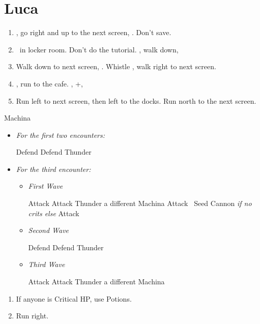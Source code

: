\chapter{Luca}

\begin{enumerate}
	\item \sd, go right and up to the next screen, \cs[2:30]. Don't save.
	\item \sd\ in locker room. Don't do the tutorial. \sd, walk down, \sd
	\item Walk down to next screen, \sd. Whistle \cs[0:30], walk right to next screen.
	\item \sd, run to the cafe. \sd, \skippablefmv+\cs[1:20], \sd
	\item Run left to next screen, then left to the docks. Run north to the next screen.
\end{enumerate}
\begin{battle}{Machina}
	\begin{itemize}
	\item \textit{For the first two encounters:}
	\begin{itemize}
		\tidusf Defend
		\kimahrif Defend
		\luluf Thunder
	\end{itemize}
	\item \textit{For the third encounter:}
	\begin{itemize}
		\item \textit{First Wave}
		\begin{itemize}
			\tidusf Attack
			\kimahrif Attack
			\luluf Thunder a different Machina
			\tidusf Attack
			\kimahrif \od\ Seed Cannon \textit{if no crits else} Attack
		\end{itemize}
		\item \textit{Second Wave}
		\begin{itemize}
			\tidusf Defend
			\kimahrif Defend
			\luluf Thunder
		\end{itemize}
		\item \textit{Third Wave}
		\begin{itemize}
			\tidusf Attack
			\kimahrif Attack
			\luluf Thunder a different Machina
		\end{itemize}
	\end{itemize}
	\end{itemize}
\end{battle}
\begin{enumerate}[resume]
	\item If anyone is Critical HP, use Potions.
	\item Run right.
\end{enumerate}
